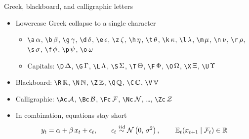 \documentclass[10pt,itemsep]{beamer}
\begin{document}
\begin{frame}[t]
    {Greek, blackboard, and calligraphic letters}
    \begin{itemize}
        \item Lowercase Greek collapse to a single character
        \begin{itemize}
            \item \texttt{\textbackslash a}\,$\a$, \texttt{\textbackslash b}\,$\b$, \texttt{\textbackslash g}\,$\g$, \texttt{\textbackslash d}\,$\d$, \texttt{\textbackslash e}\,$\e$, \texttt{\textbackslash z}\,$\z$, \texttt{\textbackslash h}\,$\h$, \texttt{\textbackslash t}\,$\t$, \texttt{\textbackslash k}\,$\k$, \texttt{\textbackslash l}\,$\l$, \texttt{\textbackslash m}\,$\m$, \texttt{\textbackslash n}\,$\n$, \texttt{\textbackslash r}\,$\r$, \texttt{\textbackslash s}\,$\s$, \texttt{\textbackslash f}\,$\f$, \texttt{\textbackslash p}\,$\p$, \texttt{\textbackslash o}\,$\o$
            \item Capitals: \texttt{\textbackslash D}\,$\D$, \texttt{\textbackslash G}\,$\G$, \texttt{\textbackslash L}\,$\L$, \texttt{\textbackslash S}\,$\S$, \texttt{\textbackslash T}\,$\T$, \texttt{\textbackslash F}\,$\F$, \texttt{\textbackslash O}\,$\O$, \texttt{\textbackslash X}\,$\X$, \texttt{\textbackslash U}\,$\U$
        \end{itemize}
        \item Blackboard: \texttt{\textbackslash R}\,$\R$, \texttt{\textbackslash N}\,$\N$, \texttt{\textbackslash Z}\,$\Z$, \texttt{\textbackslash Q}\,$\Q$, \texttt{\textbackslash C}\,$\C$, \texttt{\textbackslash V}\,$\V$
        \item Calligraphic: \texttt{\textbackslash Ac}\,$\Ac$, \texttt{\textbackslash Bc}\,$\Bc$, \texttt{\textbackslash Fc}\,$\Fc$, \texttt{\textbackslash Nc}\,$\Nc$, \ldots, \texttt{\textbackslash Zc}\,$\Zc$
        \item In combination, equations stay short
        \begin{equation*}
            y_{t} = \a + \b\, x_{t} + \e_{t}, \qquad \e_{t} \iid \Nc\bp{0,\,\s^{2}}, \qquad \E[t]{x_{t+1} \mid \Fc_{t}} \in \R
        \end{equation*}
    \end{itemize}
\end{frame}
\end{document}
